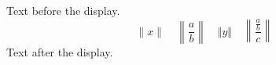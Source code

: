 \documentclass{article}
\begin{document}
Text before the display.
\[
  \| x \| \quad \left\| \frac{a}{b} \right\| \quad \Vert y \Vert
  \quad \left\| \frac{\frac{a}{b}}{c} \right\|
\]
Text after the display.
\end{document}
